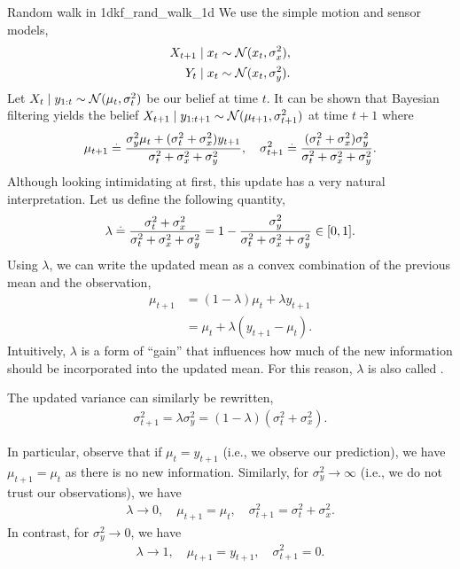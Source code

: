 \begin{ex}{Random walk in 1d}{kf_rand_walk_1d}
  We use the simple motion and sensor models, \begin{subequations}\begin{align}
    X_{t+1} \mid x_t &\sim \N{x_t}{\sigma_x^2}, \label{eq:kf_1d_motion_model} \\
    Y_t \mid x_t     &\sim \N{x_t}{\sigma_y^2}. \label{eq:kf_1d_sensor_model}
  \end{align}\end{subequations}
  Let ${X_t \mid y_{1:t} \sim \N{\mu_t}{\sigma_t^2}}$ be our belief at time $t$.
  It can be shown that Bayesian filtering yields the belief ${X_{t+1} \mid y_{1:t+1} \sim \N{\mu_{t+1}}{\sigma_{t+1}^2}}$ at time $t+1$ where  \begin{align}
    \mu_{t+1} \overset{.}{=} \frac{\sigma_y^2 \mu_t + (\sigma_t^2 + \sigma_x^2) y_{t+1}}{\sigma_t^2 + \sigma_x^2 + \sigma_y^2}, \quad \sigma_{t+1}^2 \overset{.}{=} \frac{(\sigma_t^2 + \sigma_x^2) \sigma_y^2}{\sigma_t^2 + \sigma_x^2 + \sigma_y^2}. \label{eq:kalman_posterior}
  \end{align}
  Although looking intimidating at first, this update has a very natural interpretation.
  Let us define the following quantity, \begin{align}
    \lambda \overset{.}{=} \frac{\sigma_t^2 + \sigma_x^2}{\sigma_t^2 + \sigma_x^2 + \sigma_y^2} = 1 - \frac{\sigma_y^2}{\sigma_t^2 + \sigma_x^2 + \sigma_y^2} \in [0,1]. \label{eq:kalman_gain_1d}
  \end{align}
  Using $\lambda$, we can write the updated mean as a convex combination of the previous mean and the observation, \begin{align}
    \mu_{t+1} &= (1-\lambda)\mu_t + \lambda y_{t+1} \\
    &= \mu_t + \lambda(y_{t+1} - \mu_t). \label{eq:kf_update_1d}
  \end{align}
  Intuitively, $\lambda$ is a form of ``gain'' that influences how much of the new information should be incorporated into the updated mean.
  For this reason, $\lambda$ is also called .

  The updated variance can similarly be rewritten, \begin{align}
    \sigma_{t+1}^2 = \lambda \sigma_y^2 = (1-\lambda)(\sigma_t^2 + \sigma_x^2). \label{eq:kalman_variance_1d}
  \end{align}

  In particular, observe that if ${\mu_t = y_{t+1}}$ (i.e., we observe our prediction), we have ${\mu_{t+1} = \mu_t}$ as there is no new information.
  Similarly, for $\sigma_y^2 \to \infty$ (i.e., we do not trust our observations), we have \begin{align*}
    \lambda \to 0, \quad \mu_{t+1} = \mu_t, \quad \sigma_{t+1}^2 = \sigma_t^2 + \sigma_x^2.
  \end{align*}
  In contrast, for $\sigma_y^2 \to 0$, we have \begin{align*}
    \lambda \to 1, \quad \mu_{t+1} = y_{t+1}, \quad \sigma_{t+1}^2 = 0.
  \end{align*}
\end{ex}


